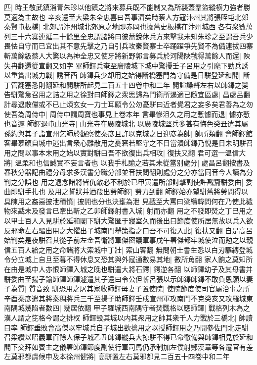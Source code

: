 匹|{
	時王敬武鎮淄青朱珍以他鎮之將來募兵既不能制又為所襲蓋羣盜縱横力強者勝莫適為主故也}
辛亥還至大梁朱全忠喜曰吾事濟矣時蔡人方寇汴州其將張晊屯北郊秦賢屯板橋|{
	北郊謂汴州城北郊原之地即赤岡也據舊史板橋在汴州城西}
各有衆數萬列三十六寨連延二十餘里全忠謂諸將曰彼蓄銳休兵方來擊我未知朱珍之至謂吾兵少畏怯自守而已宜出其不意先擊之乃自引兵攻秦賢寨士卒踊躍爭先賢不為備連拔四寨斬萬餘級蔡人大驚以為神全忠又使牙將新野郭言募兵於河陽陜虢得萬餘人而還|{
	陜失冉翻還從宣翻又如字}
畢師鐸兵奄至廣陵城下城中驚擾壬子呂用之引麾下勁兵誘以重賞出城力戰|{
	誘音酉}
師鐸兵少却用之始得斷橋塞門為守備是日駢登延和閣|{
	斷丁管翻塞悉則翻延和閣駢所起見二百五十四卷中和二年}
閣諠譟聲左右以師鐸之變告駢驚急召用之詰之用之徐對曰師鐸之衆思歸為門衛所遏適已隨宜區處|{
	昌處呂翻}
計尋退散儻或不已止煩玄女一力士耳願令公勿憂駢曰近者覺君之妄多矣君善為之勿使吾為周侍中|{
	周侍中謂周寶也事見上卷本年}
言畢慘沮久之用之慙懅而退|{
	懅亦慙也音遽}
師鐸退屯山光寺|{
	山光寺在廣陵城北}
以廣陵城堅兵多甚有悔色癸丑遣其屬孫約與其子詣宣州乞師於觀察使秦彦且許以克城之日迎彦為帥|{
	帥所類翻}
會師鐸館客畢慕顔自城中逃出言衆心離散用之憂窘若堅守之不日當潰師鐸乃悅是日未明駢召用之問以事本末用之始以實對駢曰吾不欲復出兵相攻|{
	復扶又翻}
君可選一温信大將|{
	温柔和也信誠實不妄言者也}
以我手札諭之若其未從當别處分|{
	處昌呂翻按書及春秋分器記曲禮分母求多漢書分職分部並音扶問翻則處分之分亦當同音今人讀為分判之分誤也}
用之退念諸將皆仇敵必不利於已甲寅遣所部討擊副使許戡齎駢委曲|{
	委曲即駢手扎也}
及用之誓狀并酒殽出勞師鐸|{
	勞力到翻}
師鐸始亦望駢舊將勞問得以具陳用之姦惡披泄積憤|{
	披開也分也決壅為泄}
見戡至大罵曰梁纘韓問何在乃使此穢物來戡未及發言已牽出斬之乙卯師鐸射書入城|{
	射而亦翻}
用之不發即焚之丁巳用之以甲士百人入見駢於延和閣下駢大驚匿于寢室久而後出曰節度使所居無故以兵入欲反邪命左右驅出用之大懼出子城南門舉策指之曰吾不可復入此|{
	復扶又翻}
自是高呂始判矣是夜駢召其從子前左金吾衛將軍傑密議軍事戊午署傑都牢城使泣而勉之以親信五百人給之用之命諸將大索城中丁壯|{
	索山客翻}
無問朝士書生悉以白刃驅縳登城令分立城上自旦至暮不得休息又恐其與外寇通數易其地|{
	數所角翻}
家人餉之莫知所在由是城中人亦恨師鐸入城之晚也駢遣大將石鍔|{
	鍔逆各翻}
以師鐸幼子及其母書并駢委曲至揚子諭師鐸師鐸遽遣其子還曰令公但斬呂張以示師鐸師鐸不敢負恩願以妻子為質|{
	質音致}
駢恐用之屠其家收師鐸母妻子置使院|{
	使院節度使司官屬治事之所}
辛酉秦彦遣其將秦稠將兵三千至揚子助師鐸壬戍宣州軍攻南門不克癸亥又攻羅城東南隅城幾陷者數四|{
	幾居依翻}
甲子羅城西南隅守者焚戰格以應師鐸|{
	戰格列木為之漢人謂之笓格今謂之排杈}
師鐸毁其城以内其衆用之帥其衆千人力戰於三橋北|{
	帥讀曰率}
師鐸垂敗會高傑以牢城兵自子城出欲擒用之以授師鐸用之乃開參佐門北走駢召梁纘以昭義軍百餘人保子城乙丑師鐸縱兵大掠駢不得已命徹備與師鐸相見於延和閣下交拜如賓主之儀署師鐸節度副使行軍司馬仍承制加左僕射鄭漢章等各遷官有差左莫邪都虞候申及本徐州健將|{
	高駢置左右莫邪都見二百五十四卷中和二年}
